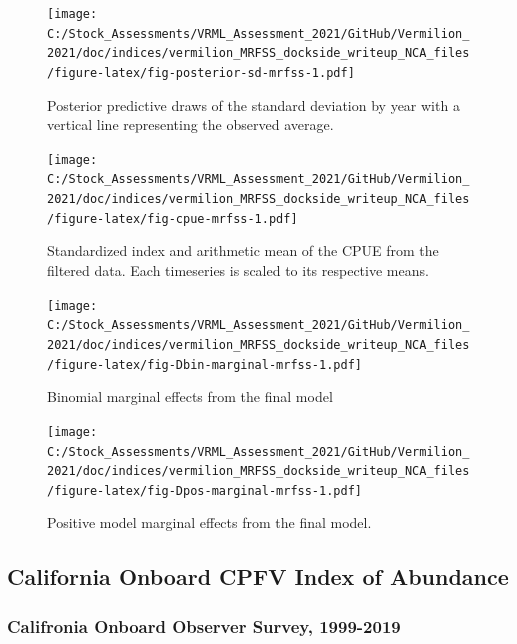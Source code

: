 \documentclass[
  english,
  a4paper,
]{article}
\begin{document}
\begin{figure}
\centering
\texttt{[image: C:/Stock\_Assessments/VRML\_Assessment\_2021/GitHub/Vermilion\_2021/doc/indices/vermilion\_MRFSS\_dockside\_writeup\_NCA\_files/figure-latex/fig-posterior-sd-mrfss-1.pdf]}
\caption{\label{fig:fig-posterior-sd-mrfss}Posterior predictive draws of the standard deviation by year with a vertical line representing the observed average.}
\end{figure}

\begin{figure}
\centering
\texttt{[image: C:/Stock\_Assessments/VRML\_Assessment\_2021/GitHub/Vermilion\_2021/doc/indices/vermilion\_MRFSS\_dockside\_writeup\_NCA\_files/figure-latex/fig-cpue-mrfss-1.pdf]}
\caption{\label{fig:fig-cpue-mrfss}Standardized index and arithmetic mean of the CPUE from the filtered data. Each timeseries is scaled to its respective means.}
\end{figure}

\begin{figure}
\centering
\texttt{[image: C:/Stock\_Assessments/VRML\_Assessment\_2021/GitHub/Vermilion\_2021/doc/indices/vermilion\_MRFSS\_dockside\_writeup\_NCA\_files/figure-latex/fig-Dbin-marginal-mrfss-1.pdf]}
\caption{\label{fig:fig-Dbin-marginal-mrfss}Binomial marginal effects from the final model}
\end{figure}

\begin{figure}
\centering
\texttt{[image: C:/Stock\_Assessments/VRML\_Assessment\_2021/GitHub/Vermilion\_2021/doc/indices/vermilion\_MRFSS\_dockside\_writeup\_NCA\_files/figure-latex/fig-Dpos-marginal-mrfss-1.pdf]}
\caption{\label{fig:fig-Dpos-marginal-mrfss}Positive model marginal effects from the final model.}
\end{figure}

\clearpage

\hypertarget{cpfv-index}{%
\subsection{California Onboard CPFV Index of Abundance}\label{cpfv-index}}

\hypertarget{califronia-onboard-observer-survey-1999-2019}{%
\subsubsection{Califronia Onboard Observer Survey, 1999-2019}\label{califronia-onboard-observer-survey-1999-2019}}
\end{document}
